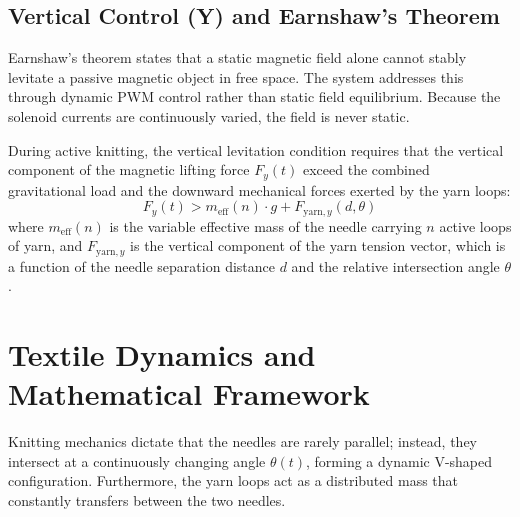 \documentclass[10pt]{article}
\begin{document}
\subsection{Vertical Control (Y) and Earnshaw's Theorem}
Earnshaw's theorem states that a static magnetic field alone cannot stably levitate a passive magnetic object in free space. The system addresses this through dynamic PWM control rather than static field equilibrium. Because the solenoid currents are continuously varied, the field is never static.

During active knitting, the vertical levitation condition requires that the vertical component of the magnetic lifting force $F_y(t)$ exceed the combined gravitational load and the downward mechanical forces exerted by the yarn loops:
\begin{equation}
F_y(t)>m_{\mathrm{eff}}(n)\cdot g+F_{\mathrm{yarn},y}(d,\theta)
\tag{1}
\end{equation}
where $m_{\mathrm{eff}}(n)$ is the variable effective mass of the needle carrying $n$ active loops of yarn, and $F_{\mathrm{yarn},y}$ is the vertical component of the yarn tension vector, which is a function of the needle separation distance $d$ and the relative intersection angle $\theta$.

\section{Textile Dynamics and Mathematical Framework}
Knitting mechanics dictate that the needles are rarely parallel; instead, they intersect at a continuously changing angle $\theta(t)$, forming a dynamic V-shaped configuration. Furthermore, the yarn loops act as a distributed mass that constantly transfers between the two needles.
\end{document}
